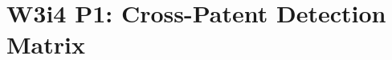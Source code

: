 %

\usepackage{amsmath,amssymb,amsfonts,amsthm,mathtools}
\usepackage{booktabs}
\usepackage{longtable}
\usepackage{array}
\usepackage{colortbl}
\usepackage{xcolor}
\usepackage{enumitem}
\usepackage{siunitx}
\usepackage{hyperref}

\newcommand{\dpsi}{\delta\psi}
\newcommand{\lam}{\lambda}
\newcommand{\SNR}{\mathrm{SNR}}
\newcommand{\order}[1]{\mathcal{O}(#1)}
\newcommand{\half}{\tfrac{1}{2}}
\newcommand{\ee}[1]{\times 10^{#1}}
\newcommand{\ns}{\,\mathrm{ns}}
\newcommand{\ps}{\,\mathrm{ps}}
\newcommand{\fs}{\,\mathrm{fs}}
\newcommand{\muHz}{\,\mu\mathrm{Hz}}
\newcommand{\lbone}{|\lam - 1|}


\newtheorem{theorem}{Theorem}[section]
\newtheorem{proposition}[theorem]{Proposition}
\newtheorem{corollary}[theorem]{Corollary}
\newtheorem{lemma}[theorem]{Lemma}
\newtheorem{definition}[theorem]{Definition}
\newtheorem{finding}[theorem]{Finding}
\newtheorem{correction}[theorem]{Correction}

\section{W3i4 P1: Cross-Patent Detection Matrix}
\label{sec:intro}

